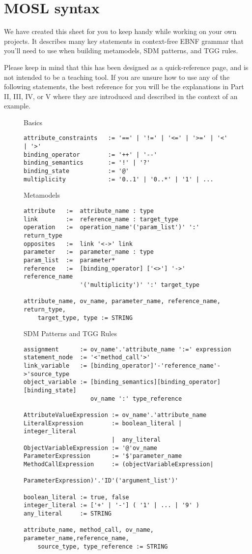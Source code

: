\newpage
\section{MOSL syntax}
\texHeader

We have created this sheet for you to keep handy while working on your own projects. It describes many key statements in context-free EBNF grammar that you'll
need to use when building metamodels, SDM patterns, and TGG rules.

Please keep in mind that this has been designed as a quick-reference page, and is not intended to be a teaching tool. If you are unsure how to use any
of the following statements, the best reference for you will be the explanations in Part II, III, IV, or V where they are introduced and described in the
context of an example.

\begin{figure}[htbp]
Basics
\begin{lstlisting}[backgroundcolor=\color{codelightgray}]
attribute_constraints 	:= '==' | '!=' | '<=' | '>=' | '<' | '>'
binding_operator 		:= '++' | '--'
binding_semantics 		:= '!' | '?'
binding_state 			:= '@'
multiplicity 			:= '0..1' | '0..*' | '1' | ...
\end{lstlisting}

Metamodels
\begin{lstlisting}[backgroundcolor=\color{codelightgray}]
attribute	:=	attribute_name : type
link		:=	reference_name : target_type
operation	:=	operation_name'('param_list')' ':' return_type
opposites	:=	link '<->' link
parameter	:=	parameter_name : type
param_list	:=	parameter*
reference	:=	[binding_operator] ['<>'] '->' reference_name 
				'('multiplicity')' ':' target_type

attribute_name, ov_name, parameter_name, reference_name, return_type, 
	target_type, type := STRING
\end{lstlisting}

SDM Patterns and TGG Rules
\begin{lstlisting}[backgroundcolor=\color{codelightgray}]
assignment		:= ov_name'.'attribute_name ':=' expression
statement_node	:= '<'method_call'>'
link_variable 	:= [binding_operator]'-'reference_name'->'source_type
object_variable := [binding_semantics][binding_operator][binding_state] 
                   ov_name ':' type_reference
										
AttributeValueExpression := ov_name'.'attribute_name
LiteralExpression        := boolean_literal | integer_literal 
                         |  any_literal
ObjectVariableExpression := '@'ov_name
ParameterExpression      := '$'parameter_name
MethodCallExpression     := (objectVariableExpression| 
                           ParameterExpression)'.'ID'('argument_list')'

boolean_literal := true, false
integer_literal := ['+' | '-'] ( '1' | ... | '9' )
any_literal 	:= STRING

attribute_name, method_call, ov_name, parameter_name,reference_name, 
	source_type, type_reference := STRING
\end{lstlisting}
\end{figure}
